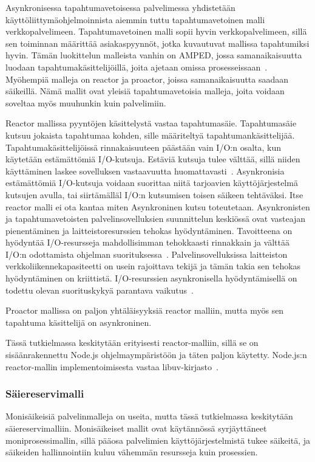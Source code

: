 \documentclass[12pt]{article}
\begin{document}
Asynkronisessa tapahtumavetoisessa palvelimessa yhdistetään
käyttöliittymäohjelmoinnista aiemmin tuttu tapahtumavetoinen malli
verkkopalvelimeen. Tapahtumavetoinen malli sopii hyvin verkkopalvelimeen,
sillä sen toiminnan määrittää asiakaspyynnöt, jotka
kuvautuvat mallissa tapahtumiksi hyvin.
Tämän luokittelun malleista vanhin on AMPED, jossa
samanaikaisuutta luodaan tapahtumakäsittelijöillä, joita
ajetaan omissa prosesseissaan~\cite{pai_flash:_1999}.
Myöhempiä malleja on reactor ja proactor, joissa samanaikaisuutta
saadaan säikeillä. Nämä mallit ovat yleisiä tapahtumavetoisia malleja,
joita voidaan soveltaa myös muuhunkin kuin palvelimiin.

Reactor mallissa pyyntöjen käsittelystä
vastaa tapahtumasäie.
Tapahtumasäie kutsuu jokaista tapahtumaa kohden, sille
määriteltyä tapahtumankäsittelijää.
Tapahtumakäsittelijöissä rinnakaisuuteen päästään
vain I/O:n osalta, kun käytetään estämättömiä
I/O-kutsuja.
Estäviä kutsuja tulee välttää,
sillä niiden käyttäminen laskee sovelluksen
vastaavuutta huomattavasti~\cite{schmidt_reactor:_1995}.
Asynkronisia estämättömiä I/O-kutsuja 
voidaan suorittaa niitä tarjoavien käyttöjärjestelmä kutsujen
avulla, tai siirtämälläl I/O:n kutsumisen toisen säikeen tehtäväksi.
Itse reactor malli ei ota kantaa miten Asynkroninen kutsu toteutetaan.
Asynkronisten ja tapahtumavetoisten palvelinsovelluksien suunnittelun keskiössä
ovat vasteajan pienentäminen ja laitteistoresurssien tehokas hyödyntäminen.
Tavoitteena on hyödyntää I/O-resursseja mahdollisimman tehokkaasti
rinnakkain ja välttää I/O:n odottamista ohjelman suorituksessa~\cite{pai_flash:_1999}.
Palvelinsovelluksissa
laitteiston verkkoliikennekapasiteetti on usein rajoittava tekijä ja tämän takia
sen tehokas hyödyntäminen on kriittistä. I/O-resurssien asynkronisella hyödyntämisellä on todettu
olevan suorituskykyä parantava vaikutus~\cite{hu_applying_1998}.

Proactor mallissa on paljon yhtäläisyyksiä reactor malliin, mutta myös sen
tapahtuma käsittelijä on asynkroninen.

 Tässä tutkielmassa keskitytään erityisesti
reactor-malliin, sillä se on sisäänrakennettu Node.js ohjelmaympäristöön ja
täten paljon käytetty. Node.js:n reactor-mallin implementoimisesta vastaa
libuv-kirjasto~\cite{libuv_design_2019}.

\subsubsection{Säiereservimalli}
Monisäikeisiä palvelinmalleja on useita, mutta tässä tutkielmassa keskitytään säiereservimalliin.
Monisäikeiset mallit ovat käytännössä syrjäyttäneet moniprosessimallin, sillä pääosa
palvelimien käyttöjärjestelmistä tukee säikeitä, ja säikeiden hallinnointiin
kuluu vähemmän resursseja kuin prosessien.
\end{document}
